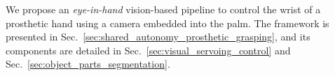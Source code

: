 \begin{comment}
\begin{figure}
    \centering
    \texttt{[image: Figures/obj\_parts.png]}
    \caption{The 15 YCB objects with labeled object parts. The red and green masks encode the \textit{top grasp} and \textit{side grasp}, respectively. The non-highlighted object parts are labeled as \textit{no grasp}.  }
    \vspace{-0.50cm}
    \label{fig:obj_parts}
\end{figure}
\end{comment}

We propose an \textit{eye-in-hand} vision-based pipeline to control the wrist of a prosthetic hand using a camera embedded into the palm. The framework is presented in Sec.~\ref{sec:shared_autonomy_prosthetic_grasping}, and its components are detailed in Sec.~\ref{sec:visual_servoing_control} and Sec.~\ref{sec:object_parts_segmentation}.

